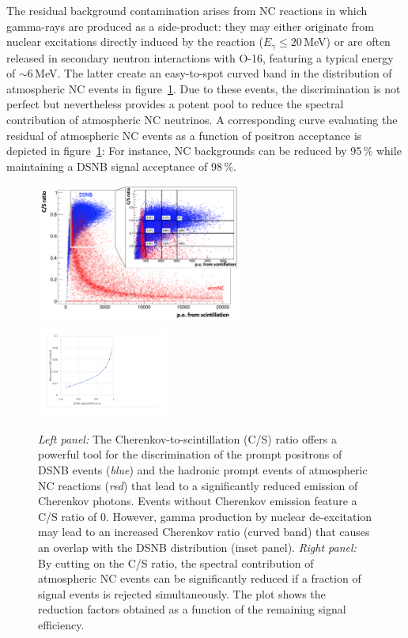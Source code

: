 \begin{itemize}
The residual background contamination arises from NC reactions in which gamma-rays are produced as a side-product: they may either originate from nuclear excitations directly induced by the reaction ($E_\gamma\leq20$\,MeV) or are often released in secondary neutron interactions with O-16, featuring a typical energy of $\sim$6\,MeV. The latter create an easy-to-spot curved band in the distribution of atmospheric NC events in figure~\ref{fig:dsnb_csratio}. Due to these events, the discrimination is not perfect but nevertheless provides a potent pool to reduce the spectral contribution of atmospheric NC neutrinos. A corresponding curve evaluating the residual of atmospheric NC events as a function of positron acceptance is depicted in figure~\ref{fig:dsnb_csratio}: For instance, NC backgrounds can be reduced by 95\,\% while maintaining a DSNB signal acceptance of 98\,\%.

\begin{figure}[htp!]
\centering
\includegraphics[width=0.6\textwidth]{dsnb/dsnb_cs_ratio}
\includegraphics[width=0.39\textwidth]{dsnb/dsnb_cs_efficiencies}
\caption{{\it Left panel:} The Cherenkov-to-scintillation (C/S) ratio offers a powerful tool for the discrimination of the prompt positrons of DSNB events ({\it blue}) and the hadronic prompt events of atmospheric NC reactions ({\it red}) that lead to a significantly reduced emission of Cherenkov photons. Events without Cherenkov emission feature a C/S ratio of 0. However, gamma production by nuclear de-excitation may lead to an increased Cherenkov ratio (curved band) that causes an overlap with the DSNB distribution (inset panel).
{\it Right panel:} By cutting on the C/S ratio, the spectral contribution of atmospheric NC events can be significantly reduced if a fraction of signal events is rejected simultaneously. The plot shows the reduction factors obtained as a function of the remaining signal efficiency.}
\label{fig:dsnb_csratio}
\end{figure}


\end{itemize}
